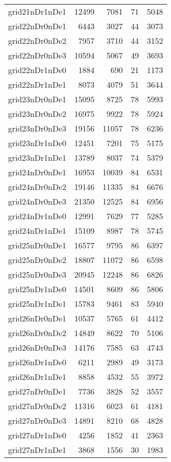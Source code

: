 \begin{longtable}{lrrrr}
grid21nDr1nDe1 & 12499 & 7081 & 71 & 5048 \\
grid22nDr0nDe1 & 6443 & 3027 & 44 & 3073 \\
grid22nDr0nDe2 & 7957 & 3710 & 44 & 3152 \\
grid22nDr0nDe3 & 10594 & 5067 & 49 & 3693 \\
grid22nDr1nDe0 & 1884 & 690 & 21 & 1173 \\
grid22nDr1nDe1 & 8073 & 4079 & 51 & 3644 \\
grid23nDr0nDe1 & 15095 & 8725 & 78 & 5993 \\
grid23nDr0nDe2 & 16975 & 9922 & 78 & 5924 \\
grid23nDr0nDe3 & 19156 & 11057 & 78 & 6236 \\
grid23nDr1nDe0 & 12451 & 7201 & 75 & 5175 \\
grid23nDr1nDe1 & 13789 & 8037 & 74 & 5379 \\
grid24nDr0nDe1 & 16953 & 10039 & 84 & 6531 \\
grid24nDr0nDe2 & 19146 & 11335 & 84 & 6676 \\
grid24nDr0nDe3 & 21350 & 12525 & 84 & 6956 \\
grid24nDr1nDe0 & 12991 & 7629 & 77 & 5285 \\
grid24nDr1nDe1 & 15109 & 8987 & 78 & 5745 \\
grid25nDr0nDe1 & 16577 & 9795 & 86 & 6397 \\
grid25nDr0nDe2 & 18807 & 11072 & 86 & 6598 \\
grid25nDr0nDe3 & 20945 & 12248 & 86 & 6826 \\
grid25nDr1nDe0 & 14501 & 8609 & 86 & 5806 \\
grid25nDr1nDe1 & 15783 & 9461 & 83 & 5940 \\
grid26nDr0nDe1 & 10537 & 5765 & 61 & 4412 \\
grid26nDr0nDe2 & 14849 & 8622 & 70 & 5106 \\
grid26nDr0nDe3 & 14176 & 7585 & 63 & 4743 \\
grid26nDr1nDe0 & 6211 & 2989 & 49 & 3173 \\
grid26nDr1nDe1 & 8858 & 4532 & 55 & 3972 \\
grid27nDr0nDe1 & 7736 & 3828 & 52 & 3557 \\
grid27nDr0nDe2 & 11316 & 6023 & 61 & 4181 \\
grid27nDr0nDe3 & 14891 & 8210 & 68 & 4828 \\
grid27nDr1nDe0 & 4256 & 1852 & 41 & 2363 \\
grid27nDr1nDe1 & 3868 & 1556 & 30 & 1983 \\

\end{longtable}
